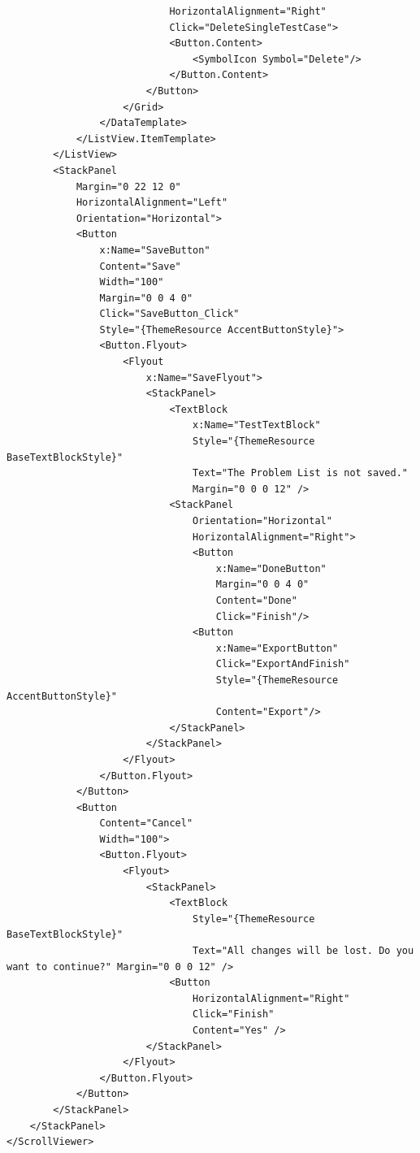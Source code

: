 \documentclass[a4paper]{report}
\begin{document}
\begin{verbatim}
                            HorizontalAlignment="Right"
                            Click="DeleteSingleTestCase">
                            <Button.Content>
                                <SymbolIcon Symbol="Delete"/>
                            </Button.Content>
                        </Button>
                    </Grid>
                </DataTemplate>
            </ListView.ItemTemplate>
        </ListView>
        <StackPanel 
            Margin="0 22 12 0"
            HorizontalAlignment="Left"
            Orientation="Horizontal">
            <Button
                x:Name="SaveButton"
                Content="Save"
                Width="100"
                Margin="0 0 4 0"
                Click="SaveButton_Click"
                Style="{ThemeResource AccentButtonStyle}">
                <Button.Flyout>
                    <Flyout
                        x:Name="SaveFlyout">
                        <StackPanel>
                            <TextBlock 
                                x:Name="TestTextBlock"
                                Style="{ThemeResource BaseTextBlockStyle}"
                                Text="The Problem List is not saved." 
                                Margin="0 0 0 12" />
                            <StackPanel 
                                Orientation="Horizontal"
                                HorizontalAlignment="Right">
                                <Button
                                    x:Name="DoneButton"
                                    Margin="0 0 4 0"
                                    Content="Done"
                                    Click="Finish"/>
                                <Button 
                                    x:Name="ExportButton"
                                    Click="ExportAndFinish"
                                    Style="{ThemeResource AccentButtonStyle}"
                                    Content="Export"/>
                            </StackPanel>
                        </StackPanel>
                    </Flyout>
                </Button.Flyout>
            </Button>
            <Button
                Content="Cancel"
                Width="100">
                <Button.Flyout>
                    <Flyout>
                        <StackPanel>
                            <TextBlock
                                Style="{ThemeResource BaseTextBlockStyle}"
                                Text="All changes will be lost. Do you want to continue?" Margin="0 0 0 12" />
                            <Button 
                                HorizontalAlignment="Right" 
                                Click="Finish"
                                Content="Yes" />
                        </StackPanel>
                    </Flyout>
                </Button.Flyout>
            </Button>
        </StackPanel>
    </StackPanel>
</ScrollViewer>
\end{verbatim}
\end{document}
